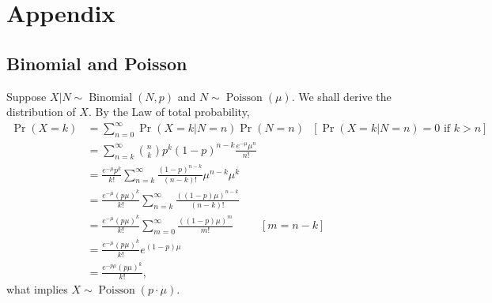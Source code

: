 \documentclass[a4paper,10pt, notitlepage]{report}
\newcommand{\pr}{\operatorname{Pr}} %
\newcommand{\Bin}{\operatorname{Binomial}}
\newcommand{\Poi}{\operatorname{Poisson}}
\begin{document}
\appendix
\section*{Appendix}
\renewcommand{\thesubsection}{\Alph{subsection}}

\subsection{Binomial and Poisson}
\label{sec:binomial-poisson}

Suppose $X|N \sim \Bin(N, p)$ and $N \sim \Poi(\mu)$. We shall derive the
distribution of $X$. By the Law of total probability, 
\begin{equation}
    \begin{split}
        \pr(X = k) &= \sum_{n=0}^{\infty} \pr(X = k|N = n)\pr(N = n) ~~~ [\pr(X = k| N = n) = 0 \text{ if } k > n] \\  
        &= \sum_{n=k}^{\infty} \binom{n}{k}p^k(1-p)^{n-k}\frac{e^{-\mu}\mu^n}{n!} \\
        &= \frac{e^{-\mu}p^k}{k!}\sum_{n=k}^{\infty} \frac{(1-p)^{n-k}}{(n-k)!}\mu^{n-k}\mu^k \\
        &= \frac{e^{-\mu}(p\mu)^k}{k!}\sum_{n=k}^{\infty} \frac{((1-p)\mu)^{n-k}}{(n-k)!} \\
        &= \frac{e^{-\mu}(p\mu)^k}{k!}\sum_{m=0}^{\infty} \frac{((1-p)\mu)^{m}}{m!} ~~~~~~~~~~~ [m = n-k] \\
        &= \frac{e^{-\mu}(p\mu)^k}{k!}e^{(1-p)\mu} \\
        &= \frac{e^{-p\mu}(p\mu)^k}{k!}, 
    \end{split}
\end{equation}
what implies $X \sim \Poi(p\cdot\mu)$.






\end{document}
